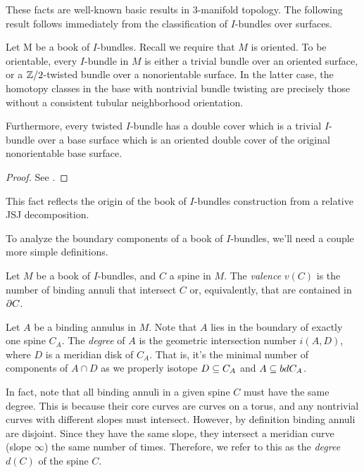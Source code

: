 These facts are well-known basic results in $3$-manifold topology.  The
following result follows immediately from the classification of $I$-bundles
over surfaces.

\begin{prop}

Let M be a book of $I$-bundles. Recall we require that $M$ is oriented. To be
orientable, every $I$-bundle in $M$ is either a trivial bundle over an oriented
surface, or a $\mathbb{Z}/2$-twisted bundle over a nonorientable surface. In the
latter case, the homotopy classes in the base with nontrivial bundle twisting
are precisely those without a consistent tubular neighborhood orientation.

Furthermore, every twisted $I$-bundle has a double cover which is a trivial
$I$-bundle over a base surface which is an oriented double cover of the
original nonorientable base surface.

\end{prop}

\begin{proof}

See \cite[Theorem 10.5]{He}.

\end{proof}

This fact reflects the origin of the book of $I$-bundles construction from
a relative JSJ decomposition.

To analyze the boundary components of a book of $I$-bundles, we'll need
a couple more simple definitions.

\begin{defn}

Let $M$ be a book of $I$-bundles, and $C$ a spine in $M$.  The \emph{valence}
$v(C)$ is the number of binding annuli that intersect $C$ or, equivalently,
that are contained in $\partial C$.

Let $A$ be a binding annulus in $M$. Note that $A$ lies in the boundary of
exactly one spine $C_A$. The \emph{degree} of $A$ is the geometric intersection
number $i(A,D)$, where $D$ is a meridian disk of $C_A$. That is, it's the
minimal number of components of $A \cap D$ as we properly isotope $D \subseteq C_A$
and $A \subseteq bd C_A$.

In fact, note that all binding annuli in a given spine $C$ must have the same
degree. This is because their core curves are curves on a torus, and any
nontrivial curves with different slopes must intersect. However, by definition
binding annuli are disjoint. Since they have the same slope, they intersect
a meridian curve (slope $\infty$) the same number of times.  Therefore, we
refer to this as the \emph{degree} $d(C)$ of the spine $C$.

\end{defn}

